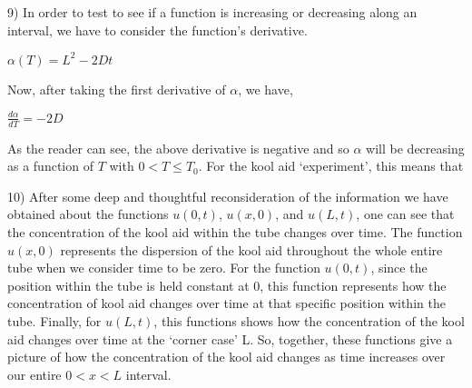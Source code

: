 \documentclass[executivepaper]{article}
\begin{document}
\begin{flushleft}

9) In order to test to see if a function is increasing or decreasing along an interval, we have to consider the function's derivative.

\pagebreak

\vspace*{-40mm}

\begin{center}

$\alpha(T)=L^2-2Dt$

\vspace{3mm}

Now, after taking the first derivative of $\alpha$, we have,

\vspace{3mm}

$\frac{d\alpha}{dT}=-2D$

\end{center}

As the reader can see, the above derivative is negative and so $\alpha$ will be decreasing as a function of $T$ with $0 < T \leq T_{0}$. For the kool aid `experiment', this means that 

\end{flushleft}

\begin{flushleft}

10) After some deep and thoughtful reconsideration of the information we have obtained about the functions $u(0,t)$, $u(x,0)$, and $u(L,t)$, one can see that the concentration of the kool aid within the tube changes over time. 
The function $u(x,0)$ represents the dispersion of the kool aid throughout the whole entire tube when we consider time to be zero. For the function $u(0,t)$, since the position within the tube is held constant at $0$, this function represents how the concentration of kool aid changes over time at that specific position within the tube. Finally, for $u(L,t)$, this functions shows how the concentration of the kool aid changes over time at the `corner case' L. So, together, these functions give a picture of how the concentration of the kool aid changes as time increases over our entire $0 < x < L$ interval.

\end{flushleft}
\end{document}
